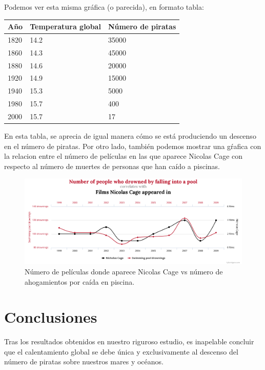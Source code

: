 \documentclass{article}
\begin{document}
Podemos ver esta misma gráfica (o parecida), en formato tabla:

\begin{table}[h]
\centering
\begin{tabular}{|l|l|l|}
\hline
\multicolumn{1}{|c|}{\textbf{Año}} & \multicolumn{1}{c|}{\textbf{Temperatura global}} & \multicolumn{1}{c|}{\textbf{Número de piratas}} \\ \hline
1820                               & 14.2                                             & 35000                                           \\ \hline
1860                               & 14.3                                             & 45000                                           \\ \hline
1880                               & 14.6                                             & 20000                                           \\ \hline
1920                               & 14.9                                             & 15000                                           \\ \hline
1940                               & 15.3                                             & 5000                                            \\ \hline
1980                               & 15.7                                             & 400                                             \\ \hline
2000                               & 15.7                                             & 17                                              \\ \hline
\end{tabular}
\end{table}

En esta tabla, se aprecia de igual manera cómo se está produciendo un descenso en el número de piratas. Por otro lado, también podemos mostrar una gŕafica con la relacion entre el número de películas en las que aparece Nicolas Cage con respecto al número de muertes de personas que han caído a piscinas.

\begin{figure}
  \includegraphics[width=\linewidth]{graph_2.png}
  \caption{Número de películas donde aparece Nicolas Cage vs número de ahogamientos por caída en piscina.}
  \label{fig:grafico_2}
\end{figure}


\section{Conclusiones}

Tras los resultados obtenidos en nuestro riguroso estudio, es inapelable concluir que el calentamiento global se debe única y exclusivamente al descenso del número de piratas sobre nuestros mares y océanos.

{}

\end{document}

